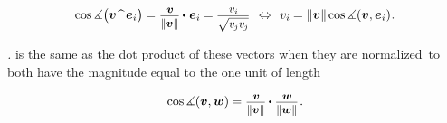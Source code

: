 \nopagebreak\vspace{-0.2em}\begin{equation}\label{anglesbetweenvectorandbasisvectors}
\operatorname{cos} \measuredangle \bigl( \bm{v} \widehat{\phantom{w}} \bm{e}_i \bigr) %
\hspace{-0.1ex}
= \scalebox{.9}{$ \displaystyle\frac{\hspace{.2ex}\raisemath{-0.16em}{\bm{v}}}{\raisemath{-0.05em}{\|\bm{v}\|}} $} \hspace{-0.1ex} \dotp \hspace{.1ex} \bm{e}_i \hspace{-0.1ex}
= \hspace{-0.1ex}\scalebox{.9}{$ \displaystyle\frac{\hspace{.2ex}\raisemath{-0.12em}{v_i}}{\raisemath{-0.1em}{\sqrt{\vphantom{i} v_{\hspace{-0.1ex}j} v_{\hspace{-0.1ex}j}}}} $}
\hspace{.4em}\Leftrightarrow\hspace{.4em}
\tikzmark{beginComponentOfVectorThruLengthAndCosine} v_i \hspace{.3ex} \tikzmark{endComponentOfVectorThruLengthAndCosine} \hspace{-0.4ex} = \|\bm{v}\| \hspace{-0.1ex} \operatorname{cos} \measuredangle ({\bm{v}, \bm{e}_i})
\hspace{.1ex} .
\end{equation}%
%
{}
\vspace{-0.6em}

\emph{.}
  is the same as the dot product of these vectors when they are normalized to both have the magnitude equal to the one unit of length

\nopagebreak\vspace{-0.2em}\begin{gather*}
\operatorname{cos} \measuredangle ({\bm{v}, \bm{w}}) \hspace{-0.1ex}
= \scalebox{.9}{$ \displaystyle\frac{\hspace{.2ex}\raisemath{-0.16em}{\bm{v}}}{\raisemath{-0.05em}{\|\bm{v}\|}} $} \hspace{-0.1ex} \dotp \scalebox{.9}{$ \displaystyle\frac{\hspace{.2ex}\raisemath{-0.16em}{\bm{w}}}{\raisemath{-0.05em}{\|\bm{w}\|}} $}
\hspace{.2ex} .
\end{gather*}

